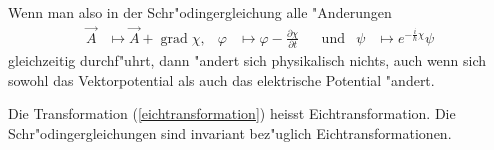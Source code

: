 Wenn man also in der Schr"odingergleichung alle "Anderungen
\begin{equation}
\begin{aligned}
\vec A&\mapsto \vec A + \operatorname{grad}\chi,
&
\varphi&\mapsto \varphi-\frac{\partial\chi}{\partial t}
&
&\text{und}&
\psi
&\mapsto
e^{-\frac{i}{\hbar}\chi}\psi
\label{eichtransformation}
\end{aligned}
\end{equation}
gleichzeitig durchf"uhrt, dann "andert sich physikalisch nichts,
auch wenn sich sowohl das Vektorpotential als auch das
elektrische Potential "andert.

Die Transformation (\ref{eichtransformation}) heisst Eichtransformation.
Die Schr"odingergleichungen sind invariant bez"uglich Eichtransformationen.


